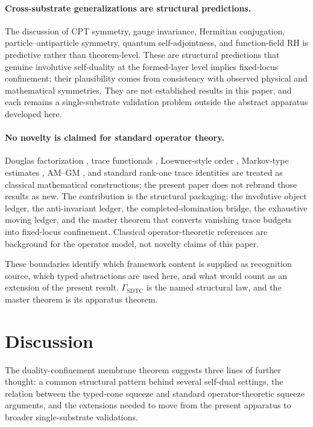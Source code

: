 \documentclass[11pt]{article}
\newcommand{\GamSDTC}{\Gamma_{\mathrm{SDTC}}}
\theoremstyle{definition}
\begin{document}
\paragraph{Cross-substrate generalizations are structural predictions.}
The discussion of CPT symmetry, gauge invariance, Hermitian
conjugation, particle--antiparticle symmetry, quantum
self-adjointness, and function-field RH is predictive rather than
theorem-level.  These are structural predictions that genuine
involutive self-duality at the formed-layer level implies
fixed-locus confinement; their plausibility comes from consistency
with observed physical and mathematical symmetries.  They are not
established results in this paper, and each remains a
single-substrate validation problem outside the abstract apparatus
developed here.

\paragraph{No novelty is claimed for standard operator theory.}
Douglas factorization \citep{Douglas1966}, trace functionals
\citep{Simon2005}, Loewner-style order
\citep{Loewner1934,Bhatia1997,HornJohnson2013}, Markov-type
estimates \citep{Folland1999}, AM--GM
\citep{HardyLittlewoodPolya1952}, and standard rank-one trace
identities \citep{ReedSimon1980} are treated as classical
mathematical constructions; the present paper does not rebrand
those results as new.  The
contribution is the structural packaging: the involutive object
ledger, the anti-invariant ledger, the completed-domination bridge,
the exhaustive moving ledger, and the master theorem that converts
vanishing trace budgets into fixed-locus confinement.  Classical
operator-theoretic references are background for the operator
model, not novelty claims of this paper.

These boundaries identify which framework content is supplied as
recognition source, which typed abstractions are used here, and what
would count as an extension of the present result.  \(\GamSDTC\) is
the named structural law, and the master theorem is its apparatus
theorem.
 

\section{Discussion}
\label{sec:discussion}

The duality-confinement membrane theorem suggests three lines of
further thought: a common structural pattern behind several
self-dual settings, the relation between the typed-cone squeeze and
standard operator-theoretic squeeze arguments, and the extensions
needed to move from the present apparatus to broader
single-substrate validations.
\end{document}
